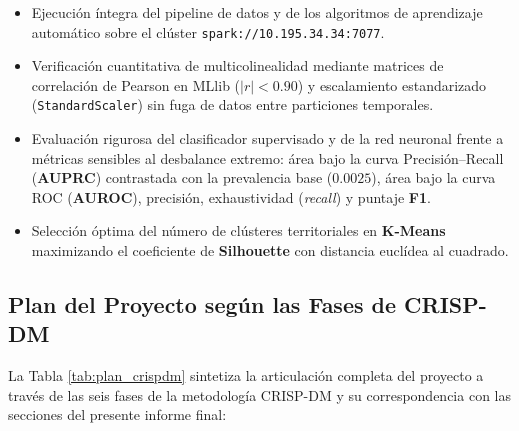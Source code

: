 \documentclass[11pt,a4paper]{article}
\begin{document}
\begin{itemize}
    \item Ejecución íntegra del pipeline de datos y de los algoritmos de aprendizaje automático sobre el clúster \texttt{spark://10.195.34.34:7077}.
    \item Verificación cuantitativa de multicolinealidad mediante matrices de correlación de Pearson en MLlib ($|r| < 0.90$) y escalamiento estandarizado (\texttt{StandardScaler}) sin fuga de datos entre particiones temporales.
    \item Evaluación rigurosa del clasificador supervisado y de la red neuronal frente a métricas sensibles al desbalance extremo: área bajo la curva Precisión--Recall (\textbf{AUPRC}) contrastada con la prevalencia base ($0.0025$), área bajo la curva ROC (\textbf{AUROC}), precisión, exhaustividad (\textit{recall}) y puntaje \textbf{F1}.
    \item Selección óptima del número de clústeres territoriales en \textbf{K-Means} maximizando el coeficiente de \textbf{Silhouette} con distancia euclídea al cuadrado.
\end{itemize}

\subsection{Plan del Proyecto según las Fases de CRISP-DM}

La Tabla \ref{tab:plan_crispdm} sintetiza la articulación completa del proyecto a través de las seis fases de la metodología CRISP-DM y su correspondencia con las secciones del presente informe final:
\end{document}
